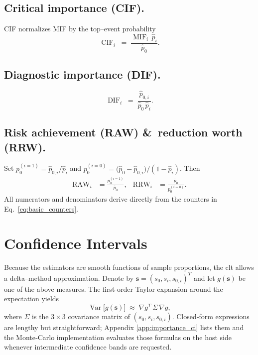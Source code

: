 \subsection{Critical importance (CIF).}
CIF normalizes MIF by the top–event probability
\[ \operatorname{CIF}_i \;=\; \frac{\operatorname{MIF}_i\,\widehat{p}_i}
                                     {\widehat{p}_0}.\]
\subsection{Diagnostic importance (DIF).}
\[ \operatorname{DIF}_i \;=\;
   \frac{\widehat{p}_{0,i}}{\widehat{p}_0\,\widehat{p}_i}.\]
\subsection{Risk achievement (RAW) \&\ reduction worth (RRW).}
Set $p_0^{(i=1)} = \widehat{p}_{0,i}/\widehat{p}_i$ and
$p_0^{(i=0)} = \bigl(\widehat{p}_0 - \widehat{p}_{0,i}\bigr)/(1-\widehat{p}_i)$.
Then
\begin{align*}
  \operatorname{RAW}_i &= \frac{p_0^{(i=1)}}{\widehat{p}_0}, &
  \operatorname{RRW}_i &= \frac{\widehat{p}_0}{p_0^{(i=0)}}.
\end{align*}
All numerators and denominators derive directly from the counters in
Eq.~\eqref{eq:basic_counters}.

\section{Confidence Intervals}
Because the estimators are smooth functions of sample proportions, the \acrshort{clt}
allows a delta–method approximation.  Denote by $\boldsymbol{s}=(s_0,s_i,s_{0,i})^T$ and
let $g(\boldsymbol{s})$ be one of the above measures.
The first‐order Taylor expansion around the expectation yields
\[
  \operatorname{Var}\bigl[g(\boldsymbol{s})\bigr]
  \;\approx\;
  \nabla g^T \!\,\Sigma\, \nabla g,
\]
where $\Sigma$ is the $3\!\times\!3$ covariance matrix of $(s_0,s_i,s_{0,i})$.
Closed‐form expressions are lengthy but straightforward; Appendix
\ref{app:importance_ci} lists them and the Monte‐Carlo implementation evaluates
those formulas on the host side whenever intermediate confidence bands are
requested.


